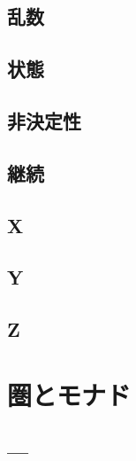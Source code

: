 \documentclass[twocolumn]{jsbook}
\newcommand{\guard}[1]{\mathop{\mid_{#1}}}
\begin{document}
\chapter{乱数}

\chapter{状態}

\chapter{非決定性}

\chapter{継続}

\chapter{X}

\chapter{Y}

\chapter{Z}


\part{圏とモナド}


\chapter{---}




\newcommand{\charlit}[1]{\texttt{#1}}

\newcommand{\applicativefunc}{\bigotimes} %
\newcommand{\bind}{\rightrightarrows} %
\newcommand{\comp}{\bullet} %
\newcommand{\concretetype}{\mathbf\ast} %
\newcommand{\defeq}{\xleftarrow{\text{def}}}
\newcommand{\dollar}{\mathop{\$}} %
\newcommand{\filterfunc}{\bigcap} %
\newcommand{\foldfunc}{\bigcup} %
\newcommand{\foldrightfunc}{\bigsqcup} %
\newcommand{\guard}[1]{\mathop{\mid_{{#1}}}}
\newcommand{\haskelllambda}{\backslash}
\newcommand{\lambdaperiod}{\;.\;}
\newcommand{\listappend}{\mathop{++}}
\newcommand{\mapfunc}{\bigodot} %
\newcommand{\monadfunc}{\bigoplus}
\newcommand{\monadjoin}{\dag}
\newcommand{\nullelem}{\emptyset}
\newcommand{\pure}{\bigstar} %
\newcommand{\typealpha}{\boldsymbol{\alpha}}
\newcommand{\unit}{\star} %
\end{document}
